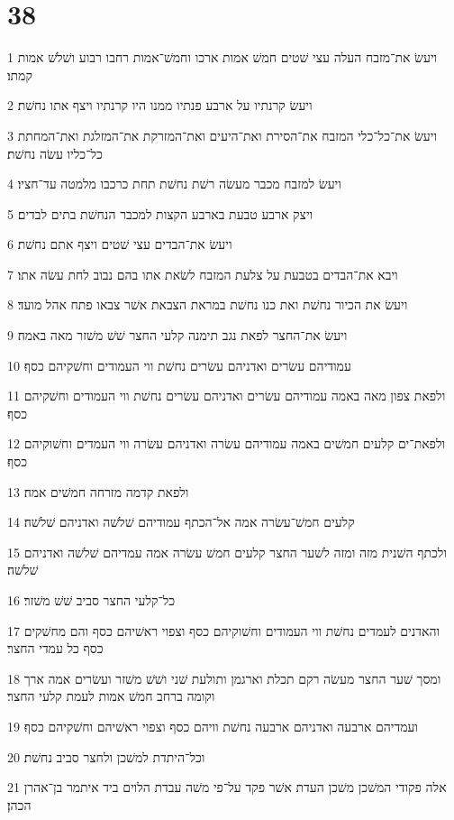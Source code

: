 \chapter{38}

\par 1 ויעשׂ את־מזבח העלה עצי שׁטים חמשׁ אמות ארכו וחמשׁ־אמות רחבו רבוע ושׁלשׁ אמות קמתו׃
\par 2 ויעשׂ קרנתיו על ארבע פנתיו ממנו היו קרנתיו ויצף אתו נחשׁת׃
\par 3 ויעשׂ את־כל־כלי המזבח את־הסירת ואת־היעים ואת־המזרקת את־המזלגת ואת־המחתת כל־כליו עשׂה נחשׁת׃
\par 4 ויעשׂ למזבח מכבר מעשׂה רשׁת נחשׁת תחת כרכבו מלמטה עד־חציו׃
\par 5 ויצק ארבע טבעת בארבע הקצות למכבר הנחשׁת בתים לבדים׃
\par 6 ויעשׂ את־הבדים עצי שׁטים ויצף אתם נחשׁת׃
\par 7 ויבא את־הבדים בטבעת על צלעת המזבח לשׂאת אתו בהם נבוב לחת עשׂה אתו׃
\par 8 ויעשׂ את הכיור נחשׁת ואת כנו נחשׁת במראת הצבאת אשׁר צבאו פתח אהל מועד׃
\par 9 ויעשׂ את־החצר לפאת נגב תימנה קלעי החצר שׁשׁ משׁזר מאה באמה׃
\par 10 עמודיהם עשׂרים ואדניהם עשׂרים נחשׁת ווי העמודים וחשׁקיהם כסף׃
\par 11 ולפאת צפון מאה באמה עמודיהם עשׂרים ואדניהם עשׂרים נחשׁת ווי העמודים וחשׁקיהם כסף׃
\par 12 ולפאת־ים קלעים חמשׁים באמה עמודיהם עשׂרה ואדניהם עשׂרה ווי העמדים וחשׁוקיהם כסף׃
\par 13 ולפאת קדמה מזרחה חמשׁים אמה׃
\par 14 קלעים חמשׁ־עשׂרה אמה אל־הכתף עמודיהם שׁלשׁה ואדניהם שׁלשׁה׃
\par 15 ולכתף השׁנית מזה ומזה לשׁער החצר קלעים חמשׁ עשׂרה אמה עמדיהם שׁלשׁה ואדניהם שׁלשׁה׃
\par 16 כל־קלעי החצר סביב שׁשׁ משׁזר׃
\par 17 והאדנים לעמדים נחשׁת ווי העמודים וחשׁוקיהם כסף וצפוי ראשׁיהם כסף והם מחשׁקים כסף כל עמדי החצר׃
\par 18 ומסך שׁער החצר מעשׂה רקם תכלת וארגמן ותולעת שׁני ושׁשׁ משׁזר ועשׂרים אמה ארך וקומה ברחב חמשׁ אמות לעמת קלעי החצר׃
\par 19 ועמדיהם ארבעה ואדניהם ארבעה נחשׁת וויהם כסף וצפוי ראשׁיהם וחשׁקיהם כסף׃
\par 20 וכל־היתדת למשׁכן ולחצר סביב נחשׁת׃
\par 21 אלה פקודי המשׁכן משׁכן העדת אשׁר פקד על־פי משׁה עבדת הלוים ביד איתמר בן־אהרן הכהן׃
